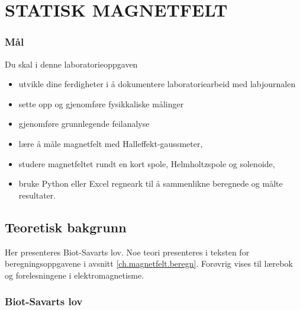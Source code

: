 \documentclass[../Elmag-labhefte-2020.tex]{subfiles}
\begin{document}
\chapter{STATISK MAGNETFELT \label{ch.magnetfelt}}

\subsection*{Mål}

Du skal i denne laboratorieoppgaven
%
\begin{itemize}
    \item utvikle dine ferdigheter i å dokumentere laboratoriearbeid med labjournalen
    \item sette opp og gjenomføre fysikkaliske målinger
    \item gjenomføre grunnlegende feilanalyse 
    \item lære å måle magnetfelt med Halleffekt-gaussmeter, 
    \item studere magnetfeltet rundt en kort spole, Helmholtzspole og solenoide,
    \item bruke Python eller Excel regneark til å sammenlikne beregnede og målte resultater.
\end{itemize}
%

\section{Teoretisk bakgrunn}

Her presenteres Biot-Savarts lov. Noe teori presenteres i teksten for beregningsoppgavene i avsnitt \ref{ch.magnetfelt.beregn}. Forøvrig vises til lærebok og forelesningene i elektromagnetisme.

\subsection{Biot-Savarts lov}
\end{document}
